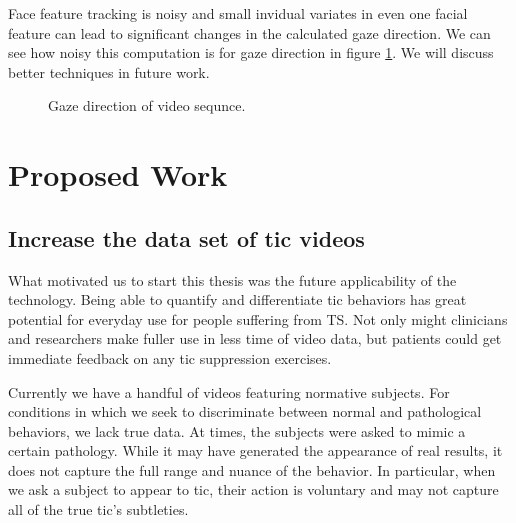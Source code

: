 \documentclass[11pt]{article}
\begin{document}
Face feature tracking is noisy and small invidual variates in even one facial feature can lead to significant changes in the calculated gaze direction. We can see how noisy this computation is for gaze direction in figure \ref{gazegraph}. We will discuss better techniques in future work.
\begin{figure}%
    \centering
    \caption{Gaze direction of video sequnce.}
    \label{gazegraph}%
\end{figure}

\section{Proposed Work}
\subsection{Increase the data set of tic videos}
What motivated us to start this thesis was the future applicability of the technology. Being able to quantify and differentiate tic behaviors has great potential for everyday use for people suffering from TS. Not only might clinicians and researchers make fuller use in less time of video data, but patients could get immediate feedback on any tic suppression exercises.

Currently we have a handful of videos featuring normative subjects. For conditions in which we seek to discriminate between normal and pathological behaviors, we lack true data. At times, the subjects were asked to mimic a certain pathology. While it may have generated the appearance of real results, it does not capture the full range and nuance of the behavior. In particular, when we ask a subject to appear to tic, their action is voluntary and may not capture all of the true tic's subtleties.
\end{document}
